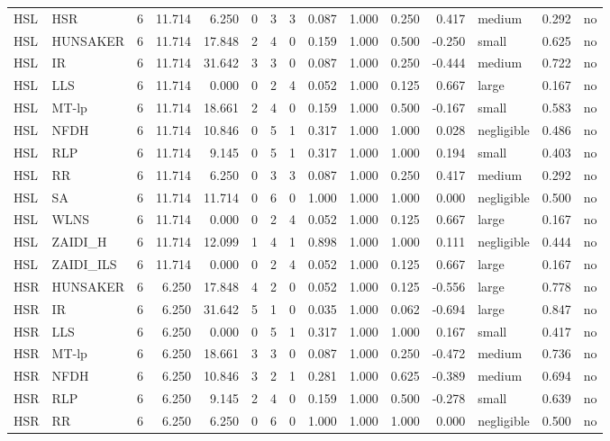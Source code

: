 \begin{table}[htbp]
\begin{tabular}{llrrrrrrrrrrlrr}
HSL & HSR & 6 & 11.714 & 6.250 & 0 & 3 & 3 & 0.087 & 1.000 & 0.250 & 0.417 & medium & 0.292 & no \\
HSL & HUNSAKER & 6 & 11.714 & 17.848 & 2 & 4 & 0 & 0.159 & 1.000 & 0.500 & -0.250 & small & 0.625 & no \\
HSL & IR & 6 & 11.714 & 31.642 & 3 & 3 & 0 & 0.087 & 1.000 & 0.250 & -0.444 & medium & 0.722 & no \\
HSL & LLS & 6 & 11.714 & 0.000 & 0 & 2 & 4 & 0.052 & 1.000 & 0.125 & 0.667 & large & 0.167 & no \\
HSL & MT-lp & 6 & 11.714 & 18.661 & 2 & 4 & 0 & 0.159 & 1.000 & 0.500 & -0.167 & small & 0.583 & no \\
HSL & NFDH & 6 & 11.714 & 10.846 & 0 & 5 & 1 & 0.317 & 1.000 & 1.000 & 0.028 & negligible & 0.486 & no \\
HSL & RLP & 6 & 11.714 & 9.145 & 0 & 5 & 1 & 0.317 & 1.000 & 1.000 & 0.194 & small & 0.403 & no \\
HSL & RR & 6 & 11.714 & 6.250 & 0 & 3 & 3 & 0.087 & 1.000 & 0.250 & 0.417 & medium & 0.292 & no \\
HSL & SA & 6 & 11.714 & 11.714 & 0 & 6 & 0 & 1.000 & 1.000 & 1.000 & 0.000 & negligible & 0.500 & no \\
HSL & WLNS & 6 & 11.714 & 0.000 & 0 & 2 & 4 & 0.052 & 1.000 & 0.125 & 0.667 & large & 0.167 & no \\
HSL & ZAIDI\_H & 6 & 11.714 & 12.099 & 1 & 4 & 1 & 0.898 & 1.000 & 1.000 & 0.111 & negligible & 0.444 & no \\
HSL & ZAIDI\_ILS & 6 & 11.714 & 0.000 & 0 & 2 & 4 & 0.052 & 1.000 & 0.125 & 0.667 & large & 0.167 & no \\
HSR & HUNSAKER & 6 & 6.250 & 17.848 & 4 & 2 & 0 & 0.052 & 1.000 & 0.125 & -0.556 & large & 0.778 & no \\
HSR & IR & 6 & 6.250 & 31.642 & 5 & 1 & 0 & 0.035 & 1.000 & 0.062 & -0.694 & large & 0.847 & no \\
HSR & LLS & 6 & 6.250 & 0.000 & 0 & 5 & 1 & 0.317 & 1.000 & 1.000 & 0.167 & small & 0.417 & no \\
HSR & MT-lp & 6 & 6.250 & 18.661 & 3 & 3 & 0 & 0.087 & 1.000 & 0.250 & -0.472 & medium & 0.736 & no \\
HSR & NFDH & 6 & 6.250 & 10.846 & 3 & 2 & 1 & 0.281 & 1.000 & 0.625 & -0.389 & medium & 0.694 & no \\
HSR & RLP & 6 & 6.250 & 9.145 & 2 & 4 & 0 & 0.159 & 1.000 & 0.500 & -0.278 & small & 0.639 & no \\
HSR & RR & 6 & 6.250 & 6.250 & 0 & 6 & 0 & 1.000 & 1.000 & 1.000 & 0.000 & negligible & 0.500 & no \\

\end{tabular}
\end{table}
